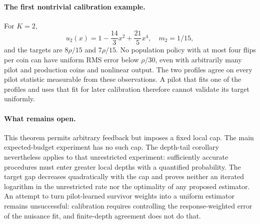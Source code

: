 \documentclass[11pt]{article}
\begin{document}
\paragraph{The first nontrivial calibration example.}
For $K=2$,
\[
 u_2(x)=1-\frac{14}3x^2+\frac{21}5x^4,\quad m_2=1/15,
\]
and the targets are $8\rho/15$ and $7\rho/15$. No population policy with
at most four flips per coin can have uniform RMS error below $\rho/30$,
even with arbitrarily many pilot and production coins and nonlinear output.
The two profiles agree on every pilot statistic measurable from these
observations. A pilot that fits one of the profiles and uses that fit for
later calibration therefore cannot validate its target uniformly.

\paragraph{What remains open.}
This theorem permits arbitrary feedback but imposes a fixed local cap. The
main expected-budget experiment has no such cap. The depth-tail corollary
nevertheless applies to that unrestricted experiment: sufficiently accurate
procedures must enter greater local depths with a quantified probability.
The target gap decreases quadratically with the cap and proves neither an iterated logarithm in the
unrestricted rate nor the optimality of any proposed estimator. An attempt
to turn pilot-learned survivor weights into a uniform estimator remains
unsuccessful: calibration requires controlling the response-weighted error
of the nuisance fit, and finite-depth agreement does not do that.
\end{document}
